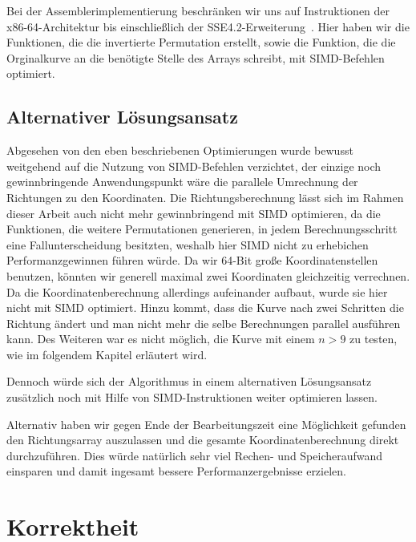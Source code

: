 \documentclass[course=asp]{aspdoc}
\begin{document}
Bei der Assemblerimplementierung beschr\"anken wir uns auf Instruktionen der x86-64-Architektur bis einschlie\ss lich der SSE4.2-Erweiterung~\cite{intel2020man}. Hier haben wir die Funktionen, die die invertierte Permutation erstellt, sowie die Funktion, die die Orginalkurve an die ben\"otigte Stelle des Arrays schreibt, mit SIMD-Befehlen optimiert. 


\subsection{Alternativer L\"osungsansatz} \label{Alternativer L\"osungsansatz}

Abgesehen von den eben beschriebenen Optimierungen wurde bewusst weitgehend auf die Nutzung von SIMD-Befehlen verzichtet, der einzige noch gewinnbringende Anwendungspunkt w\"are die parallele Umrechnung der Richtungen zu den Koordinaten. Die Richtungsberechnung l\"asst sich im Rahmen dieser Arbeit auch nicht mehr gewinnbringend mit SIMD optimieren, da die Funktionen, die weitere Permutationen generieren, in jedem Berechnungsschritt eine Fallunterscheidung besitzten, weshalb hier SIMD nicht zu erhebichen Performanzgewinnen f\"uhren w\"urde. 
Da wir 64-Bit gro\ss e Koordinatenstellen benutzen, k\"onnten wir generell maximal zwei Koordinaten gleichzeitig verrechnen. Da die Koordinatenberechnung allerdings aufeinander aufbaut, wurde sie hier nicht mit SIMD optimiert. Hinzu kommt, dass die Kurve nach zwei Schritten die Richtung \"andert und man nicht mehr die selbe Berechnungen parallel ausf\"uhren kann. Des Weiteren war es nicht m\"oglich, die Kurve mit einem $n > 9$ zu testen, wie im folgendem Kapitel erl\"autert wird.

Dennoch w\"urde sich der Algorithmus in einem alternativen L\"osungsansatz zus\"atzlich noch mit Hilfe von SIMD-Instruktionen weiter optimieren lassen.  

Alternativ haben wir gegen Ende der Bearbeitungszeit eine M\"oglichkeit gefunden den Richtungsarray auszulassen und die gesamte Koordinatenberechnung direkt durchzuf\"uhren. Dies w\"urde nat\"urlich sehr viel Rechen- und Speicheraufwand einsparen und damit ingesamt bessere Performanzergebnisse erzielen.

\newpage

\section{Korrektheit} \label{Korrektheit} %
\end{document}
